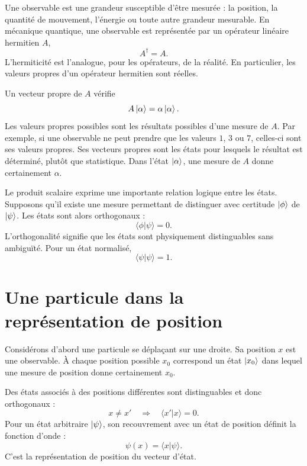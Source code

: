 Une observable est une grandeur susceptible d’être mesurée : la position, la quantité de mouvement, l’énergie ou toute autre grandeur mesurable. En mécanique quantique, une observable est représentée par un opérateur linéaire hermitien \(A\),
\begin{equation}
A^\dagger=A.
\end{equation}
L’hermiticité est l’analogue, pour les opérateurs, de la réalité. En particulier, les valeurs propres d’un opérateur hermitien sont réelles.

Un vecteur propre de \(A\) vérifie
\begin{equation}
A\left\lvert\alpha\right\rangle=\alpha\left\lvert\alpha\right\rangle.
\end{equation}
Les valeurs propres possibles sont les résultats possibles d’une mesure de \(A\). Par exemple, si une observable ne peut prendre que les valeurs \(1\), \(3\) ou \(7\), celles-ci sont ses valeurs propres. Ses vecteurs propres sont les états pour lesquels le résultat est déterminé, plutôt que statistique. Dans l’état \(\left\lvert\alpha\right\rangle\), une mesure de \(A\) donne certainement \(\alpha\).

Le produit scalaire exprime une importante relation logique entre les états. Supposons qu’il existe une mesure permettant de distinguer avec certitude \(\left\lvert\phi\right\rangle\) de \(\left\lvert\psi\right\rangle\). Les états sont alors orthogonaux :
\begin{equation}
\langle\phi|\psi\rangle=0.
\end{equation}
L’orthogonalité signifie que les états sont physiquement distinguables sans ambiguïté. Pour un état normalisé,
\begin{equation}
\langle\psi|\psi\rangle=1.
\end{equation}

\section{Une particule dans la représentation de position}

Considérons d’abord une particule se déplaçant sur une droite. Sa position \(x\) est une observable. À chaque position possible \(x_0\) correspond un état \(\left\lvert x_0\right\rangle\) dans lequel une mesure de position donne certainement \(x_0\).

Des états associés à des positions différentes sont distinguables et donc orthogonaux :
\begin{equation}
x\neq x'
\quad\Longrightarrow\quad
\langle x'|x\rangle=0.
\end{equation}
Pour un état arbitraire \(\left\lvert\psi\right\rangle\), son recouvrement avec un état de position définit la fonction d’onde :
\begin{equation}
\psi(x)=\langle x|\psi\rangle.
\end{equation}
C’est la représentation de position du vecteur d’état.

